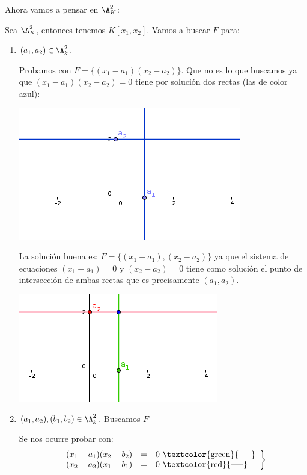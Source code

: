 Ahora vamos a pensar en  $\A_K^2$:
\begin{example}	
Sea $\A_K^2$, entonces tenemos $K[x_1,x_2]$. Vamos a buscar $F$ para:

\begin{enumerate}
\item $(a_1,a_2) \in \A^2_k$.

Probamos con $F=\{(x_1-a_1)(x_2-a_2)\}$. Que no es lo que buscamos ya que $(x_1-a_1)(x_2-a_2)=0$ tiene por solución dos rectas (las de color azul):

\begin{center}
	\includegraphics[scale=0.45]{img/ej1.png}
\end{center}

La solución buena es:  $F=\{(x_1-a_1),(x_2-a_2)\}$ ya que el sistema de ecuaciones $(x_1-a_1)=0$ y $(x_2-a_2)=0$ tiene como solución el punto de intersección de ambas rectas que es precisamente $(a_1,a_2)$.

\begin{center}
	\includegraphics[scale=0.45]{img/ej2.png}
\end{center}


\item $(a_1,a_2),(b_1,b_2) \in \A^2_k$. Buscamos $F$

Se nos ocurre probar con:
\[
\left.
\begin{array}{rcl}
	(x_1-a_1)(x_2-b_2) & = & 0  \text{ \textcolor{green}{-----}}\\
	(x_2-a_2)(x_1-b_1) & = & 0 \text{ \textcolor{red}{-----}}
\end{array}
\right\}
\]


\end{enumerate}
\end{example}

